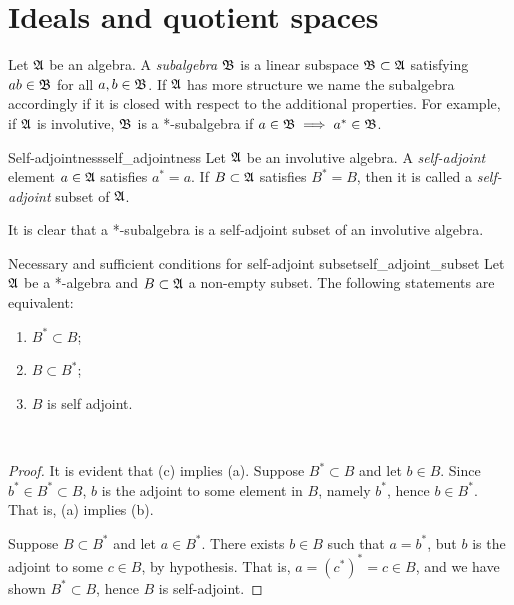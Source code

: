 \section{Ideals and quotient spaces}
Let \(\mathfrak{A}\) be an algebra. A \emph{subalgebra} \(\mathfrak{B}\) is a linear subspace \(\mathfrak{B} \subset \mathfrak{A}\) satisfying \(ab \in \mathfrak{B}\) for all \(a, b \in \mathfrak{B}\). If \(\mathfrak{A}\) has more structure we name the subalgebra accordingly if it is closed with respect to the additional properties. For example, if \(\mathfrak{A}\) is involutive, \(\mathfrak{B}\) is a *-subalgebra if \(a \in \mathfrak{B} \implies a^* \in \mathfrak{B}\).
\begin{definition}{Self-adjointness}{self_adjointness}
    Let \(\mathfrak{A}\) be an involutive algebra. A \emph{self-adjoint} element \(a \in \mathfrak{A}\) satisfies \(a^* = a\). If \(B \subset \mathfrak{A}\) satisfies \(B^* = B\), then it is called a \emph{self-adjoint} subset of \(\mathfrak{A}\).
\end{definition}
\begin{remark}
    It is clear that a *-subalgebra is a self-adjoint subset of an involutive algebra.
\end{remark}
\begin{proposition}{Necessary and sufficient conditions for self-adjoint subset}{self_adjoint_subset}
    Let \(\mathfrak{A}\) be a *-algebra and \(B \subset \mathfrak{A}\) a non-empty subset. The following statements are equivalent:
    \begin{enumerate}[label=(\alph*)]
        \item \(B^* \subset B\);
        \item \(B \subset B^*\);
        \item \(B\) is self adjoint.
    \end{enumerate}\
\end{proposition}
\begin{proof}
    It is evident that (c) implies (a). Suppose \(B^* \subset B\) and let \(b \in B\). Since \(b^* \in B^* \subset B\), \(b\) is the adjoint to some element in \(B\), namely \(b^*\), hence \(b \in B^*\).  That is, (a) implies (b).

    Suppose \(B \subset B^*\) and let \(a \in B^*\). There exists \(b \in B\) such that \(a = b^*\), but \(b\) is the adjoint to some \(c \in B\), by hypothesis. That is, \(a = (c^*)^* = c \in B\), and we have shown \(B^* \subset B\), hence \(B\) is self-adjoint.
\end{proof}

